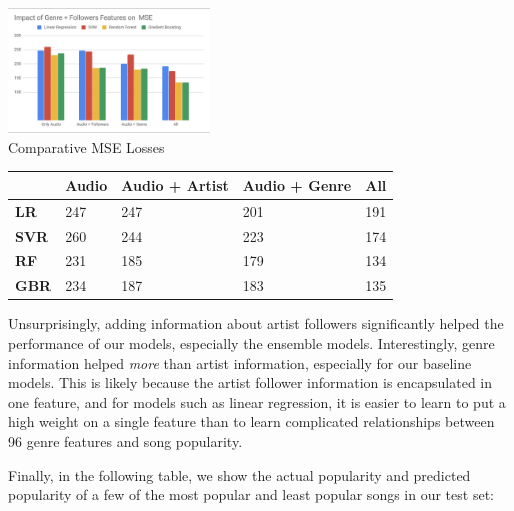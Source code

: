 \documentclass[journal]{IEEEtran}
\begin{document}
\begin{center}
\includegraphics[width = 0.4\textwidth]{images/221_model_comparison.png} \\

\caption{Comparative MSE Losses}
\centering
\label{my-label}
\begin{tabular}{|l|l|l|l|l|}
\hline
\textbf{} & Audio  & Audio + Artist  & Audio + Genre  & All    \\ \hline
\textbf{LR}   & 247 & 247 & 201 & 191 \\ \hline
\textbf{SVR}   & 260 & 244 & 223 & 174 \\ \hline
\textbf{RF}   & 231 & 185 & 179 & 134 \\ \hline
\textbf{GBR}   & 234 & 187 & 183 & 135 \\ \hline
\end{tabular}
\end{center}

\quad\newline
Unsurprisingly, adding information about artist followers significantly helped the performance of our models, especially the ensemble models. Interestingly, genre information helped \textit{more} than artist information, especially for our baseline models. This is likely because the artist follower information is encapsulated in one feature, and for models such as linear regression, it is easier to learn to put a high weight on a single feature than to learn complicated relationships between 96 genre features and song popularity.

Finally, in the following table, we show the actual popularity and predicted popularity of a few of the most popular and least popular songs in our test set:
\end{document}
